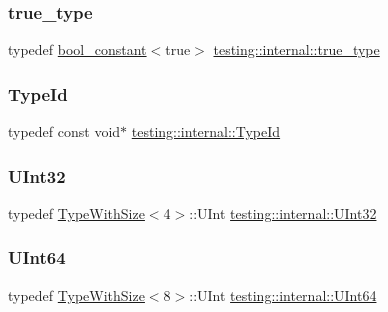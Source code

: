 \subsubsection{\texorpdfstring{true\_type}{true\_type}}
{\footnotesize\ttfamily typedef \mbox{\hyperlink{structtesting_1_1internal_1_1bool__constant}{bool\+\_\+constant}}$<$true$>$ \mbox{\hyperlink{namespacetesting_1_1internal_a62f917c3424d8841de9b49b5ec28edb4}{testing\+::internal\+::true\+\_\+type}}}

\mbox{\label{namespacetesting_1_1internal_ab1114197d3c657d8b7f8e0c5caa12d00}} 
\subsubsection{\texorpdfstring{TypeId}{TypeId}}
{\footnotesize\ttfamily typedef const void$\ast$ \mbox{\hyperlink{namespacetesting_1_1internal_ab1114197d3c657d8b7f8e0c5caa12d00}{testing\+::internal\+::\+Type\+Id}}}

\mbox{\label{namespacetesting_1_1internal_a40d4fffcd2bf56f18b1c380615aa85e3}} 
\subsubsection{\texorpdfstring{UInt32}{UInt32}}
{\footnotesize\ttfamily typedef \mbox{\hyperlink{classtesting_1_1internal_1_1_type_with_size}{Type\+With\+Size}}$<$4$>$\+::U\+Int \mbox{\hyperlink{namespacetesting_1_1internal_a40d4fffcd2bf56f18b1c380615aa85e3}{testing\+::internal\+::\+U\+Int32}}}

\mbox{\label{namespacetesting_1_1internal_aa6a1ac454e6d7e550fa4925c62c35caa}} 
\subsubsection{\texorpdfstring{UInt64}{UInt64}}
{\footnotesize\ttfamily typedef \mbox{\hyperlink{classtesting_1_1internal_1_1_type_with_size}{Type\+With\+Size}}$<$8$>$\+::U\+Int \mbox{\hyperlink{namespacetesting_1_1internal_aa6a1ac454e6d7e550fa4925c62c35caa}{testing\+::internal\+::\+U\+Int64}}}

